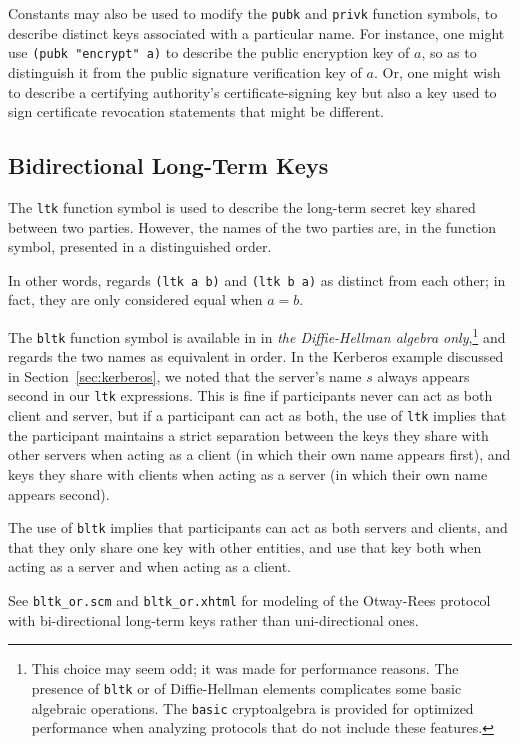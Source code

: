 Constants may also be used to modify the \texttt{pubk} and
\texttt{privk} function symbols, to describe distinct keys associated
with a particular name.  For instance, one might use \texttt{(pubk
  "encrypt" a)} to describe the public encryption key of $a$, so as to
distinguish it from the public signature verification key of $a$.  Or,
one might wish to describe a certifying authority's
certificate-signing key but also a key used to sign certificate
revocation statements that might be different.

\subsection{Bidirectional Long-Term Keys}
\label{sec:bltk}
The \texttt{ltk} function symbol is used to describe the long-term secret
key shared between two parties.  However, the names of the two parties
are, in the function symbol, presented in a distinguished order.

In other words, {\cpsa} regards \texttt{(ltk a b)} and \texttt{(ltk b
  a)} as distinct from each other; in fact, they are only considered
equal when $a = b$.

The \texttt{bltk} function symbol is available in {\cpsa} in \emph{the
  Diffie-Hellman algebra only},\footnote{This choice may seem odd; it
  was made for performance reasons.  The presence of \texttt{bltk} or
  of Diffie-Hellman elements complicates some basic algebraic
  operations.  The \texttt{basic} cryptoalgebra is provided for
  optimized performance when analyzing protocols that do not include
  these features.} and regards the two names as equivalent in order.
In the Kerberos example discussed in Section~\ref{sec:kerberos}, we
noted that the server's name $s$ always appears second in our
\texttt{ltk} expressions.  This is fine if participants never can act
as both client and server, but if a participant can act as both, the
use of \texttt{ltk} implies that the participant maintains a strict
separation between the keys they share with other servers when acting
as a client (in which their own name appears first), and keys they
share with clients when acting as a server (in which their own name
appears second).

The use of \texttt{bltk} implies that participants can act as both
servers and clients, and that they only share one key with other
entities, and use that key both when acting as a server and when
acting as a client.

 See
\texttt{bltk\_or.scm} and \texttt{bltk\_or.xhtml} for modeling of the
Otway-Rees protocol with bi-directional long-term keys rather than
uni-directional ones.

